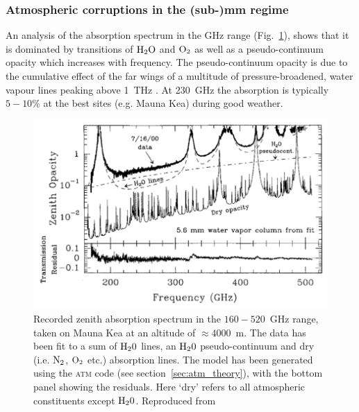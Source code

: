 \subsubsection{Atmospheric corruptions in the (sub-)mm regime}
An analysis of the absorption spectrum in the GHz range (Fig.~\ref{fig:absorption}), shows that it is dominated by transitions of $\rm H_2O$ and $\rm O_2$ as well as a pseudo-continuum opacity which increases with frequency. The pseudo-continuum opacity is due to the cumulative effect of the far wings of a multitude of pressure-broadened, water vapour lines peaking above 1~THz \citep{Carilli_1999}. At 230~GHz the absorption is typically $5-10$\% at the best sites (e.g. Mauna Kea) during good weather. 

\begin{figure}
\begin{center}
\includegraphics[width=\columnwidth]{Images/absorption}
\caption[Recorded zenith absorption spectrum in the $160-520$~GHz range, taken on Mauna Kea at an altitude of $\approx 4000$~m.]{Recorded zenith absorption spectrum in the $160-520$~GHz range, taken on Mauna Kea at an altitude of $\approx 4000$~m. The data has been fit to a sum of $\rm H_20$ lines, an $\rm H_20$ pseudo-continuum and dry (i.e. ${\rm N_2}$, ${\rm O_2}$ etc.) absorption lines. The model has been generated using the \textsc{atm} code (see section~\ref{sec:atm_theory}), with the bottom panel showing the residuals. Here `dry' refers to all atmospheric constituents except $\rm H_20$. Reproduced from \citet{Pardo_2001} \label{fig:absorption}
}
\end{center}
\end{figure}

